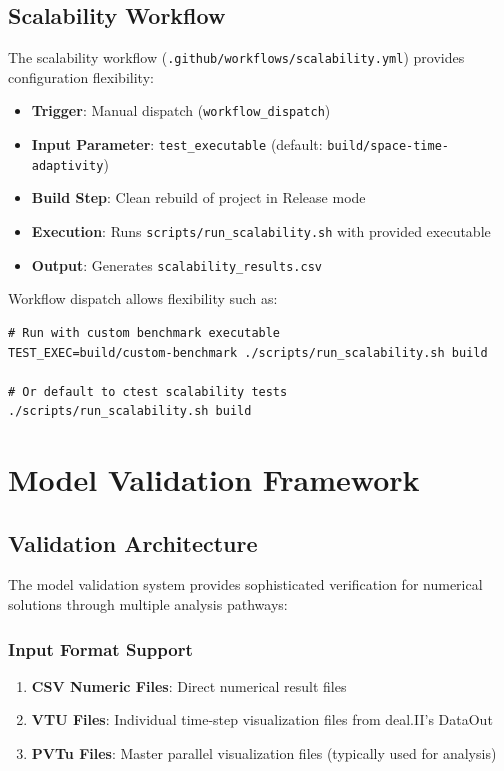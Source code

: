 \documentclass[11pt,a4paper]{article}
\begin{document}
\subsection{Scalability Workflow}

The scalability workflow (\texttt{.github/workflows/scalability.yml}) provides configuration flexibility:

\begin{itemize}
    \item \textbf{Trigger}: Manual dispatch (\texttt{workflow\_dispatch})
    \item \textbf{Input Parameter}: \texttt{test\_executable} (default: \texttt{build/space-time-adaptivity})
    \item \textbf{Build Step}: Clean rebuild of project in Release mode
    \item \textbf{Execution}: Runs \texttt{scripts/run\_scalability.sh} with provided executable
    \item \textbf{Output}: Generates \texttt{scalability\_results.csv}
\end{itemize}

Workflow dispatch allows flexibility such as:
\begin{lstlisting}
# Run with custom benchmark executable
TEST_EXEC=build/custom-benchmark ./scripts/run_scalability.sh build

# Or default to ctest scalability tests
./scripts/run_scalability.sh build
\end{lstlisting}

\newpage

\section{Model Validation Framework}

\subsection{Validation Architecture}
The model validation system provides sophisticated verification for numerical solutions through multiple analysis pathways:

\subsubsection{Input Format Support}
\begin{enumerate}
    \item \textbf{CSV Numeric Files}: Direct numerical result files
    \item \textbf{VTU Files}: Individual time-step visualization files from deal.II's DataOut
    \item \textbf{PVTu Files}: Master parallel visualization files (typically used for analysis)
\end{enumerate}
\end{document}
